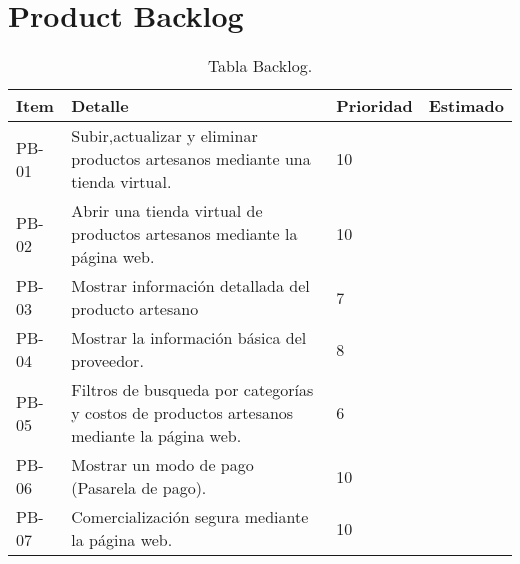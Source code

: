 \chapter{Product Backlog}


\begin{table}[htbp]
	\begin{center}
		\begin{tabular}{|p{2.5cm}|p{6.5cm}|p{2.5cm}|p{2.5cm}|}
			\hline
			Item & Detalle & Prioridad & Estimado\\
			\hline \hline
			PB-01 & Subir,actualizar y eliminar  productos artesanos mediante una tienda virtual. & 10 & \\ \hline
		    PB-02 & Abrir una tienda virtual de productos artesanos mediante la página web. & 10 & \\ \hline
			PB-03 & Mostrar información detallada del producto artesano & 7 & \\ \hline
			PB-04 & Mostrar la información básica del proveedor. & 8 & \\ \hline
			PB-05 & Filtros de busqueda por categorías y costos de productos artesanos mediante la página web. & 6 & \\ \hline
			PB-06 & Mostrar un modo de pago (Pasarela de pago). & 10 & \\ \hline
			PB-07 & Comercialización segura mediante la página web. & 10 & \\ \hline
		\end{tabular}
		\caption{Tabla Backlog.}
		\label{tabla:sencilla}
	\end{center}
\end{table}